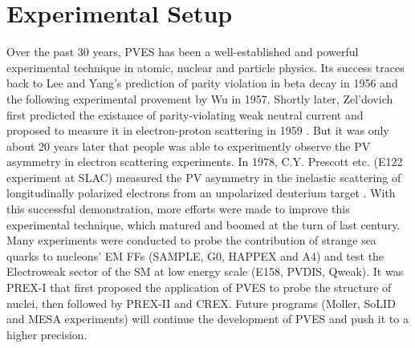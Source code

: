 \chapter{Experimental Setup}
Over the past 30 years, PVES has been a well-established and powerful 
experimental technique in atomic, nuclear and particle physics. Its success 
traces back to Lee and Yang's prediction of parity violation in beta decay in 1956 
and the following experimental provement by Wu in 1957.
Shortly later, Zel'dovich first predicted the existance of parity-violating weak 
neutral current and proposed to measure
it in electron-proton scattering in 1959 \cite{Zeldovich}. But it was only about 
20 years later that people was able to experimently observe the PV asymmetry 
in electron scattering experiments. 
In 1978, C.Y. Prescott etc. (E122 experiment at SLAC) measured the PV asymmetry in the 
inelastic scattering of longitudinally 
polarized electrons from an unpolarized deuterium target \cite{PRESCOTT1978347}.
With this successful demonstration, more efforts were made to improve this experimental
technique, which matured and boomed at the turn of last century. Many experiments 
were conducted to probe the contribution of strange sea quarks
to nucleons' EM FFs (SAMPLE, G0, HAPPEX and A4) and test the Electroweak 
sector of the SM at low energy scale (E158, PVDIS, Qweak).
It was PREX-I that first proposed the application of PVES to probe the structure
of nuclei, then followed by PREX-II and CREX. Future programs (M\/oller, SoLID 
and MESA experiments) will continue the development of PVES and push it to a
higher precision.

